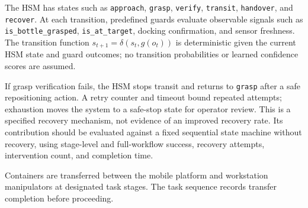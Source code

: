 The HSM has states such as \texttt{approach}, \texttt{grasp}, \texttt{verify}, \texttt{transit}, \texttt{handover}, and \texttt{recover}. At each transition, predefined guards evaluate observable signals such as \texttt{is\_bottle\_grasped}, \texttt{is\_at\_target}, docking confirmation, and sensor freshness. The transition function $s_{t+1}=\delta(s_t,g(o_t))$ is deterministic given the current HSM state and guard outcomes; no transition probabilities or learned confidence scores are assumed.

If grasp verification fails, the HSM stops transit and returns to \texttt{grasp} after a safe repositioning action. A retry counter and timeout bound repeated attempts; exhaustion moves the system to a safe-stop state for operator review. This is a specified recovery mechanism, not evidence of an improved recovery rate. Its contribution should be evaluated against a fixed sequential state machine without recovery, using stage-level and full-workflow success, recovery attempts, intervention count, and completion time.

Containers are transferred between the mobile platform and workstation manipulators at designated task stages. The task sequence records transfer completion before proceeding.
